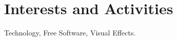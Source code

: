 \documentclass[a4paper,10pt]{article} %
\begin{document}

\section{Interests and Activities}

Technology, Free Software, Visual Effects.


\end{document}

